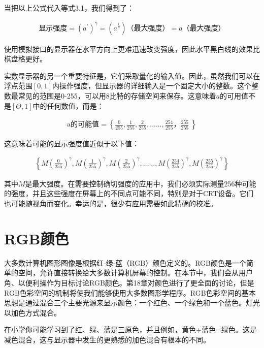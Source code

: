\documentclass[lang=cn,12pt]{elegantbook}
\begin{document}
当把以上公式代入等式3.1，我们得到了：

\[
  \begin{aligned}
    \mbox{显示强度} = (a^{'})^\gamma = (a^{\frac{1}{\gamma}})\mbox{（最大强度）} = a\mbox{（最大强度）}
  \end{aligned}
\]

\begin{note}
  使用模拟接口的显示器在水平方向上更难迅速改变强度，因此水平黑白线的效果比棋盘格更好。
\end{note}

实数显示器的另一个重要特征是，它们采取量化的输入值。因此，虽然我们可以在浮点范围$[0,1]$内操作强度，但显示器的详细输入是一个固定大小的整数。这个整数最常见的范围是0-255，可以用8比特的存储空间来保存。这意味着$a$的可用值不是$[O,1]$中的任何数值，而是：

\[
  \begin{aligned}
    \mbox{a的可能值} = \left\{ \frac{0}{255},\frac{1}{255},\frac{2}{255},……,\frac{254}{255}，\frac{255}{255}\ \right\}
  \end{aligned}
\]

这意味着可能的显示强度值近似于以下值：

\[
  \begin{aligned}
    \left\{ M(\frac{0}{255})^\gamma ,M(\frac{1}{255})^\gamma ,M(\frac{2}{255})^\gamma ,……,M(\frac{254}{255})^\gamma ,M(\frac{255}{255})^\gamma \right\}
  \end{aligned}
\]

其中$M$是最大强度。在需要控制确切强度的应用中，我们必须实际测量256种可能的强度，并且这些强度在屏幕上的不同点可能不同，特别是对于CRT设备。它们也可能随视角而变化。幸运的是，很少有应用需要如此精确的校准。

\section{RGB颜色}

大多数计算机图形图像是根据红-绿-蓝（RGB）颜色定义的。RGB颜色是一个简单的空间，允许直接转换给大多数计算机屏幕的控制。在本节中，我们会从用户角、以便利操作为目标讨论RGB颜色。第18章对颜色进行了更全面的讨论，但是RGB色彩空间的机制将使我们能够使用大多数图形学程序。RGB色彩空间的基本思想是通过混合三个主要光源来显示颜色：一个红色、一个绿色和一个蓝色。灯光以加色方式混合。

\begin{note}
  在小学你可能学习到了红、绿、蓝是三原色，并且例如，黄色+蓝色=绿色。这是减色混合，这与显示器中发生的更熟悉的加色混合有根本的不同。
\end{note}
\end{document}

